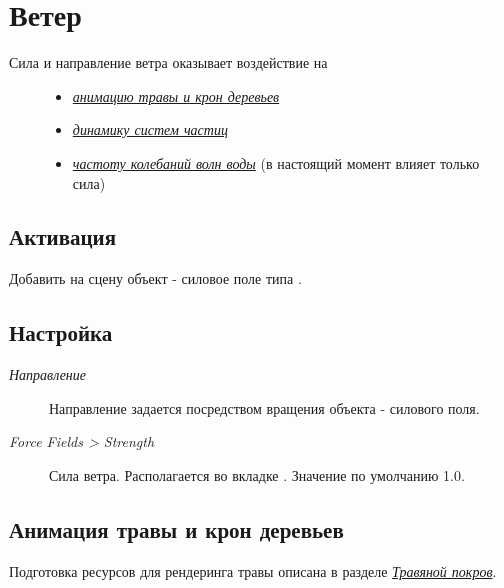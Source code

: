 \documentclass[a4paper,12pt,oneside]{sphinxmanual}
\begin{document}
\section{Ветер}
\label{outdoor_rendering:id30}\label{outdoor_rendering:wind}\begin{description}
\item[{Сила и направление ветра оказывает воздействие на}] \leavevmode\begin{itemize}
\item {} 
{\hyperref[outdoor_rendering:wind-bending]{\emph{анимацию травы и крон деревьев}}}

\item {} 
{\hyperref[particles:particles-force-fields]{\emph{динамику систем частиц}}}

\item {} 
{\hyperref[outdoor_rendering:water-volumetric-waves]{\emph{частоту колебаний волн воды}}} (в настоящий момент влияет только сила)

\end{itemize}

\end{description}


\subsection{Активация}
\label{outdoor_rendering:id31}
Добавить на сцену объект - силовое поле типа .


\subsection{Настройка}
\label{outdoor_rendering:id32}\begin{description}
\item[{\emph{Направление}}] \leavevmode
Направление задается посредством вращения объекта - силового поля.

\item[{\emph{Force Fields \textgreater{} Strength}}] \leavevmode
Сила ветра. Располагается во вкладке . Значение по умолчанию 1.0.

\end{description}


\subsection{Анимация травы и крон деревьев}
\label{outdoor_rendering:wind-bending}\label{outdoor_rendering:id33}
Подготовка ресурсов для рендеринга травы описана в разделе {\hyperref[particles_instancing:particles-grass]{\emph{Травяной покров}}}.
\end{document}
